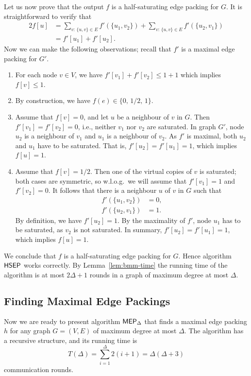 Let us now prove that the output $f$ is a half-saturating edge packing for $G$. It is straightforward to verify that
\[
\begin{split}
    2 f[u]
    &= \sum_{ v :\, \{u,v\} \in E} f'(\{u_1,v_2\}) + \sum_{ v :\, \{u,v\} \in E} f'(\{u_2,v_1\}) \\[3pt]
    &= f'[u_1] + f'[u_2].
\end{split}
\]
Now we can make the following observations; recall that $f'$ is a maximal edge packing for $G'$.
\begin{enumerate}
    \item For each node $v \in V$, we have $f'[v_1] + f'[v_2] \le 1 + 1$ which implies $f[v] \le 1$.
    \item By construction, we have $f(e) \in \{0,\,1/2,\,1\}$.
    \item Assume that $f[v] = 0$, and let $u$ be a neighbour of $v$ in $G$. Then $f'[v_1] = f'[v_2] = 0$, i.e., neither $v_1$ nor $v_2$ are saturated. In graph $G'$, node $u_2$ is a neighbour of $v_1$ and $u_1$ is a neighbour of $v_2$. As $f'$ is maximal, both $u_2$ and $u_1$ have to be saturated. That is, $f'[u_2] = f'[u_1] = 1$, which implies $f[u] = 1$.
    \item Assume that $f[v] = 1/2$. Then one of the virtual copies of $v$ is saturated; both cases are symmetric, so w.l.o.g.\ we will assume that $f'[v_1] = 1$ and $f'[v_2] = 0$. It follows that there is a neighbour $u$ of $v$ in $G$ such that
    \begin{align*}
        f'(\{u_1,v_2\}) &= 0, \\
        f'(\{u_2,v_1\}) &= 1.
    \end{align*}
    By definition, we have $f'[u_2] = 1$. By the maximality of $f'$, node $u_1$ has to be saturated, as $v_2$ is not saturated. In summary, $f'[u_2] = f'[u_1] = 1$, which implies $f[u] = 1$.
\end{enumerate}
We conclude that $f$ is a half-saturating edge packing for $G$. Hence algorithm $\textsf{HSEP}$ works correctly. By Lemma~\ref{lem:bmm-time} the running time of the algorithm is at most $2\Delta+1$ rounds in a graph of maximum degree at most $\Delta$.


\subsection{Finding Maximal Edge Packings}\label{ssec:mep}

Now we are ready to present algorithm $\textsf{MEP}_\Delta$ that finds a maximal edge packing $h$ for any graph $G = (V,E)$ of maximum degree at most $\Delta$. The algorithm has a recursive structure, and its running time is
\[
    T(\Delta) = \sum_{i = 1}^\Delta 2(i+1) = \Delta(\Delta+3)
\]
communication rounds.

